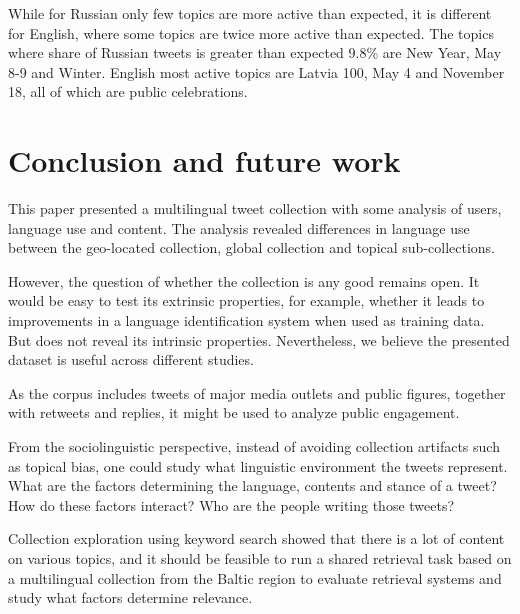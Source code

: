 \documentclass{IOS-Book-Article}
\newcommand{\hl}[1]{#1}
\begin{document}
While for Russian only few topics are more active than expected, it is different for English, where some topics are twice more active than expected. The topics where share of Russian tweets is greater than expected \hl{9.8\%} are New Year, May 8-9 and Winter. English most active topics are Latvia 100, May 4 and November 18, all of which are public celebrations. 




\section{Conclusion and future work}
\label{sec:conclusion}


This paper presented a multilingual tweet collection with some analysis of users, language use and content. The analysis revealed differences in language use between the geo-located collection, global collection and topical sub-collections.

However, the question of whether the collection is any good remains open. It would be easy to test its extrinsic properties, for example, whether it leads to improvements in a language identification system when used as training data. But does not reveal its intrinsic properties. Nevertheless, we believe the presented dataset is useful across different studies.

As the corpus includes tweets of major media outlets and public figures, together with retweets and replies, it might be used to analyze public engagement.

From the sociolinguistic perspective, instead of avoiding collection artifacts such as topical bias, one could study what linguistic environment the tweets represent. What are the factors determining the language, contents and stance of a tweet? How do these factors interact? Who are the people writing those tweets?

Collection exploration using keyword search showed that there is a lot of content on various topics, and it should be feasible to run a shared retrieval task based on a multilingual collection from the Baltic region to evaluate retrieval systems and study what factors determine relevance.





\end{document}
